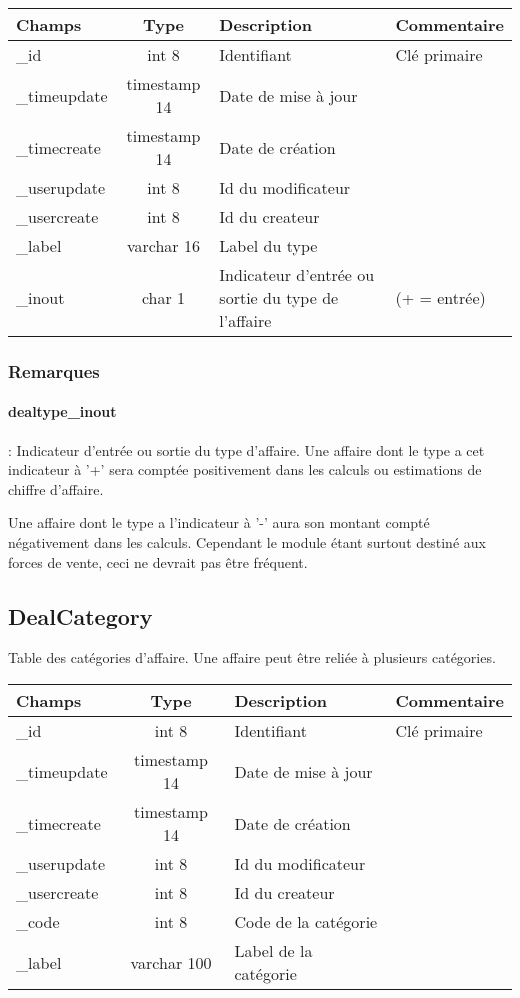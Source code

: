 \begin{tabular}{|p{3cm}|c|p{5.4cm}|p{2.6cm}|}
\hline
\textbf{Champs} & \textbf{Type} & \textbf{Description} & \textbf{Commentaire} \\
\hline
\_id & int 8 & Identifiant & Clé primaire \\
\hline
\_timeupdate & timestamp 14 & Date de mise à jour & \\
\hline
\_timecreate & timestamp 14 & Date de création & \\
\hline
\_userupdate & int 8 & Id du modificateur & \\
\hline
\_usercreate & int 8 & Id du createur & \\
\hline
\_label & varchar 16 & Label du type & \\
\hline
\_inout & char 1 & Indicateur d'entrée ou sortie du type de l'affaire & (+ = entrée) \\
\hline
\end{tabular}

\subsubsection{Remarques}

\paragraph{dealtype\_inout} : Indicateur d'entrée ou sortie du type d'affaire. Une affaire dont le type a cet indicateur à '+' sera comptée positivement dans les calculs ou estimations de chiffre d'affaire.

Une affaire dont le type a l'indicateur à '-' aura son montant compté négativement dans les calculs.
Cependant le module \deal étant surtout destiné aux forces de vente, ceci ne devrait pas être fréquent.


\subsection{DealCategory}
Table des catégories d'affaire. Une affaire peut être reliée à plusieurs catégories.\\

\begin{tabular}{|p{3cm}|c|p{5.4cm}|p{2.6cm}|}
\hline
\textbf{Champs} & \textbf{Type} & \textbf{Description} & \textbf{Commentaire} \\
\hline
\_id & int 8 & Identifiant & Clé primaire \\
\hline
\_timeupdate & timestamp 14 & Date de mise à jour & \\
\hline
\_timecreate & timestamp 14 & Date de création & \\
\hline
\_userupdate & int 8 & Id du modificateur & \\
\hline
\_usercreate & int 8 & Id du createur & \\
\hline
\_code & int 8 & Code de la catégorie & \\
\hline
\_label & varchar 100 & Label de la catégorie & \\
\hline
\end{tabular}


